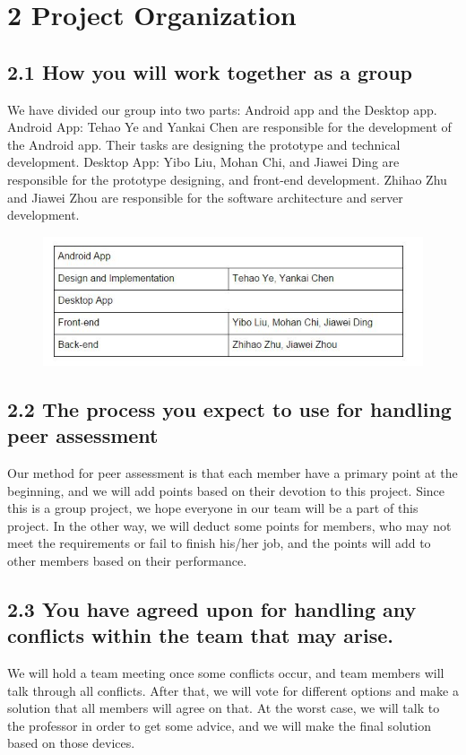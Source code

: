 \documentclass[a4paper]{report}
\begin{document}
\section* {2 Project Organization}
\subsection* {2.1 How you will work together as a group}

We have divided our group into two parts: Android app and the Desktop app.
Android App: Tehao Ye and Yankai Chen are responsible for the development of the Android app. Their tasks are designing the prototype and technical development. 
Desktop App: Yibo Liu, Mohan Chi, and Jiawei Ding are responsible for the prototype designing, and front-end development. Zhihao Zhu and Jiawei Zhou are responsible for the software architecture and server development.


\begin{figure}[h]
\centering
\includegraphics[width=4.6in]{2}
\end{figure}

\subsection* {2.2 The process you expect to use for handling peer assessment
}
Our method for peer assessment is that each member have a primary point at the beginning, and we will add points based on their devotion to this project. Since this is a group project, we hope everyone in our team will be a part of this project. In the other way, we will deduct some points for members, who may not meet the requirements or fail to finish his/her job, and the points will add to other members based on their performance.
\subsection* {2.3 You have agreed upon for handling any conflicts within the team that may arise.
}
We will hold a team meeting once some conflicts occur, and team members will talk through all conflicts. After that, we will vote for different options and make a solution that all members will agree on that. At the worst case, we will talk to the professor in order to get some advice, and we will make the final solution based on those devices.
















	
\end{document}
